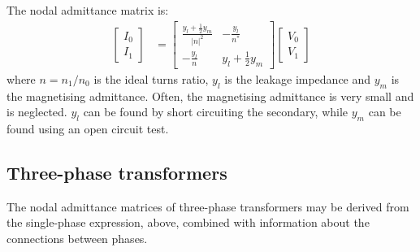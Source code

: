 \documentclass[11pt]{article}
\begin{document}
The nodal admittance matrix is:
\begin{align}
\begin{bmatrix}I_0 \\ I_1 \end{bmatrix} &= 
\begin{bmatrix}\frac{y_l + \frac{1}{2}y_m}{|n|^2} & -\frac{y_l}{n^*} \\ -\frac{y_l}{n} & y_l + \frac{1}{2}y_m\end{bmatrix}
\begin{bmatrix}V_0 \\ V_1 \end{bmatrix}
\label{EQ_REAL_TRANS}
\end{align}
where $n = n_1/n_0$ is the ideal turns ratio, $y_l$ is the leakage impedance and $y_m$ is the magnetising admittance. Often, the magnetising admittance is very small and is neglected. $y_l$ can be found by short circuiting the secondary, while $y_m$ can be found using an open circuit test.

\subsection{Three-phase transformers}
The nodal admittance matrices of three-phase transformers may be derived from the single-phase expression, above, combined with information about the connections between phases.
\end{document}
